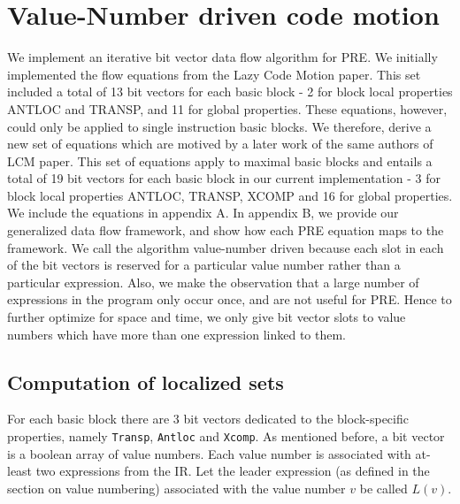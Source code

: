 \chapter{Value-Number driven code motion} \label{ch:vdcm}
We implement an iterative bit vector data flow algorithm for PRE. We initially
implemented the flow equations from the Lazy Code Motion paper. This set
included a total of 13 bit vectors for each basic block - 2 for block local
properties ANTLOC and TRANSP, and 11 for global properties. These equations,
           however, could only be applied to single instruction basic blocks.
           We therefore, derive a new set of equations which are motived by a
           later work of the same authors of LCM
           paper\cite{Knoop:1994:OCM:183432.183443}. This set of equations
           apply to maximal basic blocks and entails a total of 19 bit vectors
           for each basic block in our current implementation - 3 for block
           local properties ANTLOC, TRANSP, XCOMP and 16 for global properties.
           We include the equations in appendix A. In appendix B, we
           provide our generalized data flow framework, and show how each PRE
           equation maps to the framework. We call the algorithm value-number driven
           because each slot in each of the bit vectors is reserved for a
           particular value number rather than a particular expression. Also,
           we make the observation that a large number of expressions in the
           program only occur once, and are not useful for PRE. Hence to
           further optimize for space and time, we only give bit vector slots to
           value numbers which have more than one expression linked to them.

\section{Computation of localized sets}
For each basic block there are 3 bit vectors dedicated to the block-specific
properties, namely \texttt{Transp}, \texttt{Antloc} and \texttt{Xcomp}. As mentioned before, a bit vector
is a boolean array of value numbers. Each value number is associated with
at-least two expressions from the IR. Let the leader
expression (as defined in the section on value numbering) associated with the
value number $v$ be called $L(v)$. 


